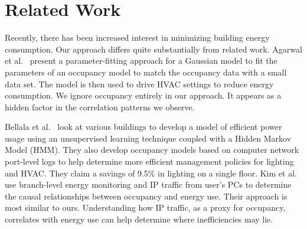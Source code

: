 \section{Related Work}
Recently, there has been increased interest in minimizing building energy consumption.  Our approach
differs quite substantially from related work.
Agarwal et al.~\cite{occmodels_buildsys11} present a parameter-fitting 
approach for a Gaussian model to fit the parameters of an occupancy model to match the occupancy data 
with a small data set.  
The model is then used to drive HVAC settings to reduce energy consumption.  We ignore occupancy entirely 
in our approach.  It appears as a hidden factor in the correlation patterns we observe.



Bellala et al.~\cite{Bellala_buildsys11} look at various buildings to develop a model of efficient power usage using 
an unsupervised learning technique coupled with a Hidden Markov Model (HMM).  They also develop occupancy models based on
computer network port-level logs to help determine more efficient management policies for lighting and HVAC.  
They claim a savings of 9.5\% in lighting on a single floor. 
Kim et al.~\cite{kim:buildsys2010} use branch-level energy monitoring and IP traffic from user's PCs to determine the
causal relationships between occupancy and energy use.  Their approach is most similar to ours.  Understanding how IP 
traffic, as a proxy for occupancy, correlates with energy use can help determine where inefficiencies may lie.


